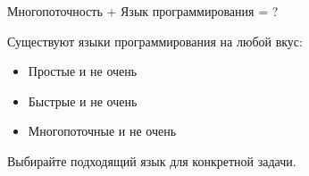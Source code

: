 \begin{frame}[t]{Многопоточность + Язык программирования = ?}

Существуют языки программирования на любой вкус:
\begin{itemize}
	\item Простые и не очень	
	\pause
	\item Быстрые и не очень
	\pause
	\item Многопоточные и не очень	
\end{itemize}

\pause

Выбирайте подходящий язык для конкретной задачи. 

\pause


\end{frame}
